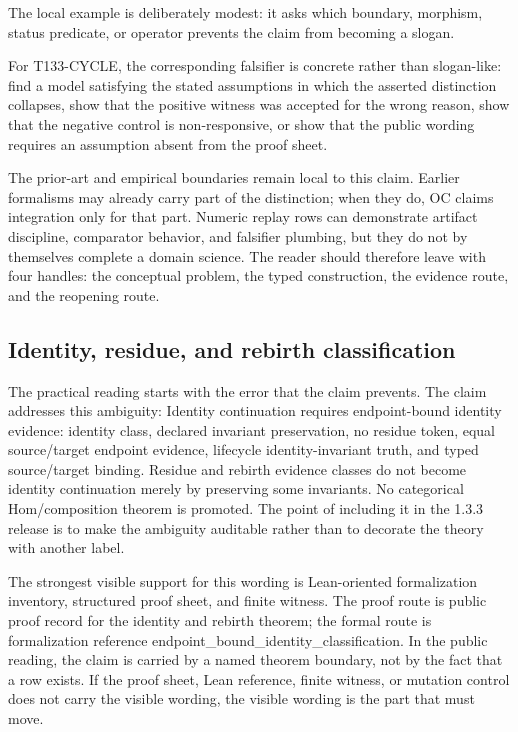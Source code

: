 The local example is deliberately modest: it asks which boundary, morphism, status predicate, or operator prevents the claim from becoming a slogan.

For T133-CYCLE, the corresponding falsifier is concrete rather than slogan-like: find a model satisfying the stated assumptions in which the asserted distinction collapses, show that the positive witness was accepted for the wrong reason, show that the negative control is non-responsive, or show that the public wording requires an assumption absent from the proof sheet.

The prior-art and empirical boundaries remain local to this claim. Earlier formalisms may already carry part of the distinction; when they do, OC claims integration only for that part. Numeric replay rows can demonstrate artifact discipline, comparator behavior, and falsifier plumbing, but they do not by themselves complete a domain science. The reader should therefore leave with four handles: the conceptual problem, the typed construction, the evidence route, and the reopening route.

\subsection{Identity, residue, and rebirth classification}
The practical reading starts with the error that the claim prevents. The claim addresses this ambiguity: Identity continuation requires endpoint-bound identity evidence: identity class, declared invariant preservation, no residue token, equal source/target endpoint evidence, lifecycle identity-invariant truth, and typed source/target binding. Residue and rebirth evidence classes do not become identity continuation merely by preserving some invariants. No categorical Hom/composition theorem is promoted. The point of including it in the 1.3.3 release is to make the ambiguity auditable rather than to decorate the theory with another label.

The strongest visible support for this wording is Lean-oriented formalization inventory, structured proof sheet, and finite witness. The proof route is public proof record for the identity and rebirth theorem; the formal route is formalization reference endpoint\_bound\_identity\_classification. In the public reading, the claim is carried by a named theorem boundary, not by the fact that a row exists. If the proof sheet, Lean reference, finite witness, or mutation control does not carry the visible wording, the visible wording is the part that must move.

